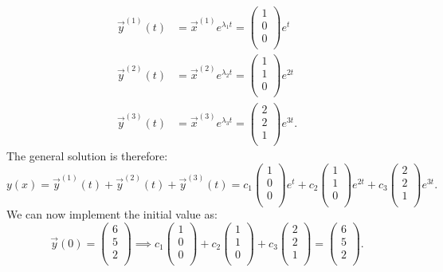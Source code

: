 \begin{align*}
  \Vec{y}^{(1)}(t) &= \Vec{x}^{(1)} e^{\lambda_1 t} = \begin{pmatrix}
  1\\
  0\\
  0\\
  \end{pmatrix} e^{t} \\
  \Vec{y}^{(2)}(t) &= \Vec{x}^{(2)} e^{\lambda_2 t} = \begin{pmatrix}
  1\\
  1\\
  0\\
  \end{pmatrix} e^{2t} \\
    \Vec{y}^{(3)}(t) &= \Vec{x}^{(3)} e^{\lambda_3 t} = \begin{pmatrix}
    2\\
    2\\
    1\\
    \end{pmatrix} e^{3t}
.\end{align*}
The general solution is therefore:
\[ 
y(x) = \Vec{y}^{(1)}(t) + \Vec{y}^{(2)}(t) + \Vec{y}^{(3)}(t) = c_1\begin{pmatrix}
1\\
0\\
0\\
\end{pmatrix} e^{t} + c_2\begin{pmatrix}
1\\
1\\
0\\
\end{pmatrix} e^{2t} + c_3\begin{pmatrix}
2\\
2\\
1\\
\end{pmatrix} e^{3t}
.\]
We can now implement the initial value as:
\[ 
\Vec{y}(0) = \begin{pmatrix}
6\\
5\\
2\\
\end{pmatrix} \implies c_1 \begin{pmatrix}
1\\
0\\
0\\
\end{pmatrix} + c_2 \begin{pmatrix}
1\\
1\\
0\\
\end{pmatrix} + c_3 \begin{pmatrix}
2\\
2\\
1\\
\end{pmatrix} = \begin{pmatrix}
6\\
5\\
2\\
\end{pmatrix}
.\]
